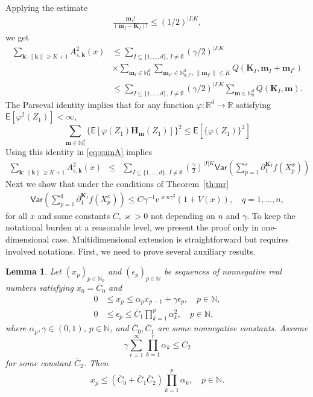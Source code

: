 \documentclass[bj]{imsart}
\def\PE{\mathsf{E}}
\def\PVar{\mathsf{Var}}
\def\nset{\mathbb{N}}
\def\rset{\mathbb{R}}
\def\rme{\mathrm{e}}
\def\rset{\mathbb{R}}
\newtheorem{lem}[thm]{Lemma}
\newcommand*{\ol}{\overline}
\begin{document}
Applying the estimate
\begin{eqnarray*}
\frac{\mathbf{m}_{I}!}{\left(\mathbf{m}_{I}+\mathbf{K}_{I}\right)!}\leq (1/2)^{|I| K},
\end{eqnarray*}
we get
\begin{align}
\label{eq:sumA}
\sum_{\mathbf{k}\colon\|\mathbf{k}\|\geq K+1}A^2_{s,\mathbf{k}}(x)
&\leq
\sum_{I\subseteq\{1,\ldots,d\},\, I\neq \emptyset} (\gamma/2)^{|I|K}
\\
\nonumber
& \times\sum_{\mathbf{m}_{I}\in\mathbb{N}_{I}^{d}} \sum_{\mathbf{m}_{I^c}\in \mathbb{N}^d_{0,I^c},\,\|\mathbf{m}_{I^c}\|\leq K} Q(\mathbf{\mathbf{K}}_{I},\mathbf{m}_{I}+\mathbf{m}_{I^c})
\\
\nonumber
&\leq
\sum_{I\subseteq\{1,\ldots,d\},\, I\neq \emptyset} (\gamma/2)^{|I|K} \sum_{\mathbf{m}\in\mathbb{N}_0^{d}} Q(\mathbf{\mathbf{K}}_{I},\mathbf{m}).
\end{align}
The Parseval identity implies that for any function $\varphi: \rset^d \to \rset$ satisfying $\PE[\varphi^2(Z_1)] < \infty$,
\[
\sum_{\mathbf{m}\in \nset^d_0} \{\PE[\varphi(Z_1) \mathbf{H}_\mathbf{m}(Z_1)] \}^2 \le \PE[\{\varphi(Z_1)\}^2]
\]
Using this identity in \eqref{eq:sumA} implies
\begin{eqnarray*}
\sum_{\mathbf{k}\colon\|\mathbf{k}\|\geq K+1}A^2_{s,\mathbf{k}}(x)
&\leq & \sum_{I\subseteq\{1,\ldots,d\},\, I\neq \emptyset}
\left(\frac{\gamma}{2}\right)^{|I|K}
\PVar\left(\sum_{p=1}^{s}\partial_{1}^{\mathbf{K}_I}f\left(X^x_{p}\right)
\right)
\end{eqnarray*}
Next we show that under the conditions  of Theorem~\ref{th:mr}
\begin{eqnarray*}
\PVar\left(\sum_{p=1}^{q}\partial_{1}^{\mathbf{K}_I}f\left(X^x_{p}\right)
\right)\leq C\gamma^{-1} \rme^{\varkappa n\gamma^2}(1+V(x)),\quad q=1,\ldots,n,
\end{eqnarray*}
for all $x$ and some constants $C,\varkappa>0$  not depending on $n$ and $\gamma.$
To keep the notational burden at a reasonable level, we present the proof only in one-dimensional case.
Multidimensional extension is straightforward but requires involved notations.
First, we need to prove several auxiliary results.
\begin{lem}\label{lem:06062018a1}
Let $(x_p)_{p\in\mathbb N_0}$
and $(\epsilon_p)_{p\in\mathbb N}$
be sequences of nonnegative real numbers
satisfying $x_0=\ol C_0$ and
\begin{align}
0&\le x_p\le\alpha_p x_{p-1}+\gamma \epsilon_p,\quad p\in\mathbb N,
\label{eq:06062018a1}\\
0&\le\epsilon_p\le\ol C_1\prod_{k=1}^p \alpha_k^2,\quad p\in\mathbb N,
\label{eq:06062018a2}
\end{align}
where $\alpha_p,\gamma\in(0,1)$, $p\in\mathbb N$,
and $\ol C_0,\ol C_1$ are some nonnegative constants. Assume
\begin{equation}\label{eq:06062018a3}
\gamma \sum_{r=1}^\infty \prod_{k=1}^r \alpha_k\le\ol C_2
\end{equation}
for some constant $\ol C_2$. Then
$$
x_p\le(\ol C_0+\ol C_1\ol C_2)\prod_{k=1}^p \alpha_k,\quad p\in\mathbb N.
$$
\end{lem}
\end{document}
